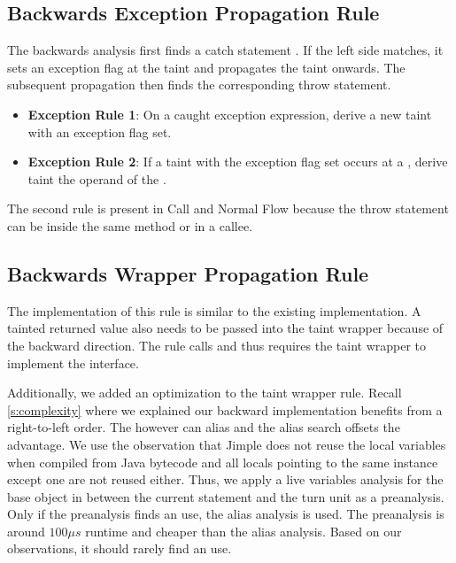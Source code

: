 \documentclass[../draft.tex]{subfiles}
\begin{document}
    \subsection{Backwards Exception Propagation Rule}
    The backwards analysis first finds a catch statement . 
    If the left side matches, it sets an exception flag at the taint and propagates the taint onwards. 
    The subsequent propagation then finds the corresponding throw statement.
    \begin{itemize}
        \item \textbf{Exception Rule 1}: On a caught exception expression, derive a new taint with an exception flag set.
        \item \textbf{Exception Rule 2}: If a taint with the exception flag set occurs at a , derive taint the operand of the . 
    \end{itemize}
    The second rule is present in Call and Normal Flow because the throw statement can be inside the same method or in a callee.

    \subsection{Backwards Wrapper Propagation Rule}
    The implementation of this rule is similar to the existing implementation. 
    A tainted returned value also needs to be passed into the taint wrapper because of the backward direction. 
    The rule calls  and thus requires the taint wrapper to implement the  interface.
    
    Additionally, we added an optimization to the taint wrapper rule. 
    Recall \autoref{s:complexity} where we explained our backward implementation benefits from a right-to-left order. 
    The  however can alias and the alias search offsets the advantage. 
    We use the observation that Jimple does not reuse the local variables when compiled from Java bytecode and all locals pointing to the same  instance except one are not reused either.
    Thus, we apply a live variables analysis for the base object in between the current statement and the turn unit as a preanalysis. 
    Only if the preanalysis finds an use, the alias analysis is used. 
    The preanalysis is around $100\mu s$ runtime and cheaper than the alias analysis.
    Based on our observations, it should rarely find an use.
\end{document}
